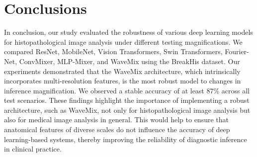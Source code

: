 \documentclass[nohyperref]{article}
\theoremstyle{plain}
\theoremstyle{definition}
\theoremstyle{remark}
\begin{document}
\section{Conclusions}
In conclusion, our study evaluated the robustness of various deep learning models for histopathological image analysis under different testing magnifications. We compared ResNet, MobileNet, Vision Transformers, Swin Transformers, Fourier-Net, ConvMixer, MLP-Mixer, and WaveMix using the BreakHis \cite{spanhol2015dataset} dataset. Our experiments demonstrated that the WaveMix architecture, which intrinsically incorporates multi-resolution features, is the most robust model to changes in inference magnification. We observed a stable accuracy of at least 87\% across all test scenarios. These findings highlight the importance of implementing a robust architecture, such as WaveMix, not only for histopathological image analysis but also for medical image analysis in general. This would help to ensure that anatomical features of diverse scales do not influence the accuracy of deep learning-based systems, thereby improving the reliability of diagnostic inference in clinical practice.
\nocite{langley00}



\end{document}
